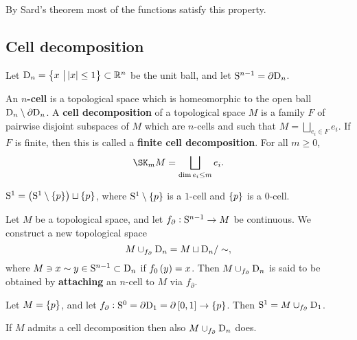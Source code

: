 \begin{fact*}
By Sard's theorem most of the functions satisfy this property.
\end{fact*}

\subsection{Cell decomposition}


\begin{notation*}
Let $ \D_n = \cbr{x \st \abs{x} \le 1} \subset \RR^n $ be the unit ball, and let $ \S^{n - 1} = \partial\D_n $.
\end{notation*}

\begin{definition}
An \textbf{$ n $-cell} is a topological space which is homeomorphic to the open ball $ \D_n \setminus \partial\D_n $. A \textbf{cell decomposition} of a topological space $ M $ is a family $ F $ of pairwise disjoint subspaces of $ M $ which are $ n $-cells and such that $ M = \bigsqcup_{e_i \in F} e_i $. If $ F $ is finite, then this is called a \textbf{finite cell decomposition}. For all $ m \ge 0 $,
$$ \SK_m M = \bigsqcup_{\dim e_i \le m} e_i. $$
\end{definition}

\begin{example}
$ \S^1 = \br{\S^1 \setminus \cbr{p}} \sqcup \cbr{p} $, where $ \S^1 \setminus \cbr{p} $ is a $ 1 $-cell and $ \cbr{p} $ is a $ 0 $-cell.
\end{example}

\begin{notation}
Let $ M $ be a topological space, and let $ f_\partial : \S^{n - 1} \to M $ be continuous. We construct a new topological space
$$ M \cup_{f_\partial} \D_n = M \sqcup \D_n / \sim, $$
where $ M \ni x \sim y \in \S^{n - 1} \subset \D_n $ if $ f_0\br{y} = x $. Then $ M \cup_{f_\partial} \D_n $ is said to be obtained by \textbf{attaching} an $ n $-cell to $ M $ via $ f_\partial $.
\end{notation}

\begin{example*}
Let $ M = \cbr{p} $, and let $ f_\partial : \S^0 = \partial\D_1 = \partial\sbr{0, 1} \to \cbr{p} $. Then $ \S^1 = M \cup_{f_\partial} \D_1 $.
\end{example*}

\begin{exercise*}
If $ M $ admits a cell decomposition then also $ M \cup_{f_\partial} \D_n $ does.
\end{exercise*}

